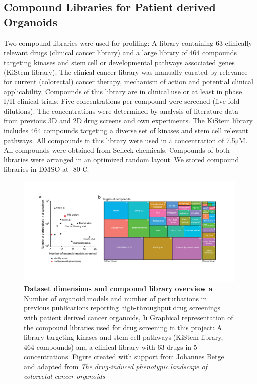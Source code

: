 \begin{flushleft}
\subsection{Compound Libraries for Patient derived Organoids}
Two compound libraries were used for profiling: A library containing 63 clinically relevant drugs (clinical cancer library) and a large library of 464 compounds targeting kinases and stem cell or developmental pathways associated genes (KiStem library). The clinical cancer library was manually curated by relevance for current (colorectal) cancer therapy, mechanism of action and potential clinical applicability. Compounds of this library are in clinical use or at least in phase I/II clinical trials. Five concentrations per compound were screened (five-fold dilutions). The concentrations were determined by analysis of literature data from previous 3D and 2D drug screens and own experiments. The KiStem library includes 464 compounds targeting a diverse set of kinases and stem cell relevant pathways. All compounds in this library were used in a concentration of 7.5μM. All compounds were obtained from Selleck chemicals. Compounds of both libraries were arranged in an optimized random layout. We stored compound libraries in DMSO at -80 C.

\begin{figure}[h]
\centering
\includegraphics[width=\textwidth,
                height=\textheight,
                keepaspectratio]{figures/promise/pdf/fig_1_3.pdf}
\caption[Dataset dimensions and compound library overview]{\textbf{Dataset dimensions and compound library overview a} Number of organoid models and number of perturbations in previous publications reporting high-throughput drug screenings with patient derived cancer organoids, \textbf{b} Graphical representation of the compound libraries used for drug screening in this project: A library targeting kinases and stem cell pathways (KiStem library, 464 compounds) and a clinical library with 63 drugs in 5 concentrations. Figure created with support from Johannes Betge and adapted from \textit{The drug-induced phenotypic landscape of colorectal cancer organoids} \parencite{betgeDruginducedPhenotypicLandscape2022}}
\label{fig_137}
\end{figure}


\end{flushleft}
